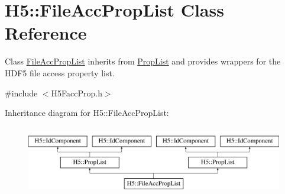 \hypertarget{class_h5_1_1_file_acc_prop_list}{}\section{H5\+:\+:File\+Acc\+Prop\+List Class Reference}
\label{class_h5_1_1_file_acc_prop_list}


Class \hyperlink{class_h5_1_1_file_acc_prop_list}{File\+Acc\+Prop\+List} inherits from \hyperlink{class_h5_1_1_prop_list}{Prop\+List} and provides wrappers for the H\+D\+F5 file access property list.  




{\ttfamily \#include $<$H5\+Facc\+Prop.\+h$>$}

Inheritance diagram for H5\+:\+:File\+Acc\+Prop\+List\+:\begin{figure}[H]
\begin{center}
\leavevmode
\includegraphics[height=3.000000cm]{class_h5_1_1_file_acc_prop_list}
\end{center}
\end{figure}
